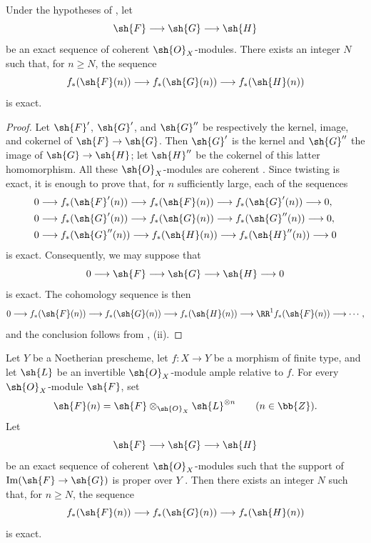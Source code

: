 \begin{corollary}[2.2.3]
\label{III.2.2.3}
Under the hypotheses of , let
\[
  \sh{F}\longrightarrow\sh{G}\longrightarrow\sh{H}
\]
be an exact sequence of coherent $\sh{O}_X$-modules.
There exists an integer $N$ such that, for $n\geq N$, the sequence
\[
  f_*(\sh{F}(n))
  \longrightarrow f_*(\sh{G}(n))
  \longrightarrow f_*(\sh{H}(n))
\]
is exact.
\end{corollary}

\begin{proof}
Let $\sh{F}'$, $\sh{G}'$, and $\sh{G}''$ be respectively the kernel, image, and cokernel of $\sh{F}\to\sh{G}$.
Then $\sh{G}'$ is the kernel and $\sh{G}''$ the image of $\sh{G}\to\sh{H}$; let $\sh{H}''$ be the cokernel of this latter homomorphism.
All these $\sh{O}_X$-modules are coherent .
Since twisting is exact, it is enough to prove that, for $n$ sufficiently large, each of the sequences
\begin{align*}
  0&\longrightarrow f_*(\sh{F}'(n))
    \longrightarrow f_*(\sh{F}(n))
    \longrightarrow f_*(\sh{G}'(n))
    \longrightarrow0,\\
  0&\longrightarrow f_*(\sh{G}'(n))
    \longrightarrow f_*(\sh{G}(n))
    \longrightarrow f_*(\sh{G}''(n))
    \longrightarrow0,\\
  0&\longrightarrow f_*(\sh{G}''(n))
    \longrightarrow f_*(\sh{H}(n))
    \longrightarrow f_*(\sh{H}''(n))
    \longrightarrow0
\end{align*}
is exact.
Consequently, we may suppose that
\[
  0\longrightarrow\sh{F}\longrightarrow\sh{G}
   \longrightarrow\sh{H}\longrightarrow0
\]
is exact.
The cohomology sequence is then
\[
  0\longrightarrow f_*(\sh{F}(n))
  \longrightarrow f_*(\sh{G}(n))
  \longrightarrow f_*(\sh{H}(n))
  \longrightarrow \RR^1f_*(\sh{F}(n))
  \longrightarrow\cdots,
\]
and the conclusion follows from , (ii).
\end{proof}


\begin{corollary}[2.2.4]
\label{III.2.2.4}
Let $Y$ be a Noetherian prescheme, let $f:X\to Y$ be a morphism of finite type, and let $\sh{L}$ be an invertible $\sh{O}_X$-module ample relative to $f$.
For every $\sh{O}_X$-module $\sh{F}$, set
\[
  \sh{F}(n)=\sh{F}\otimes_{\sh{O}_X}\sh{L}^{\otimes n}
  \qquad(n\in\bb{Z}).
\]
Let
\[
  \sh{F}\longrightarrow\sh{G}\longrightarrow\sh{H}
\]
be an exact sequence of coherent $\sh{O}_X$-modules such that the support of $\operatorname{Im}(\sh{F}\to\sh{G})$ is proper over $Y$ .
Then there exists an integer $N$ such that, for $n\geq N$, the sequence
\[
  f_*(\sh{F}(n))
  \longrightarrow f_*(\sh{G}(n))
  \longrightarrow f_*(\sh{H}(n))
\]
is exact.
\end{corollary}

